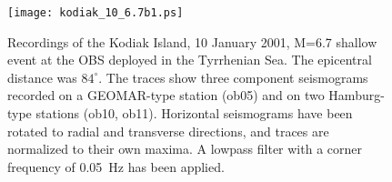 \documentclass{article}
\renewcommand{\includegraphics}[2][1]{{\sf Figure: {\tt #1}}}
\begin{document}
{%
\begin{figure}
\centerline{\texttt{[image: kodiak\_10\_6.7b1.ps]}}
\caption{Recordings 
of the Kodiak Island, 10 January 2001, M=6.7 shallow event 
at the OBS deployed in the 
Tyrrhenian Sea. 
The epicentral distance was $84^{\circ}$.
The traces show three component seismograms recorded on a 
GEOMAR-type station (ob05) and on two Hamburg-type stations 
(ob10, ob11). 
Horizontal seismograms have been rotated to 
radial and
transverse directions,
and 
traces are normalized to their own maxima.
A lowpass filter with a corner frequency of
0.05\, Hz has been applied.
}
\label{quake_tysea}
\end{figure}


}
\end{document}

